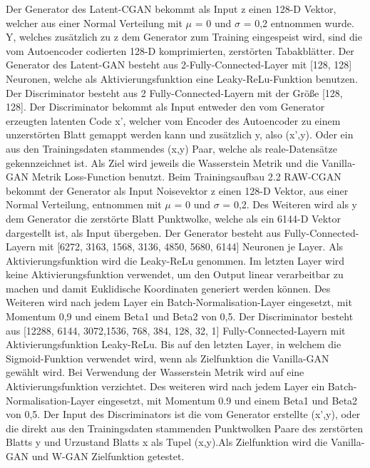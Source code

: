 \documentclass{llncs}
\begin{document}
Der Generator des Latent-CGAN bekommt als Input z einen 128-D Vektor, welcher aus einer Normal Verteilung mit $\mu$ = 0 und $\sigma$ =  0,2 entnommen wurde. Y, welches zusätzlich zu z dem Generator zum Training eingespeist wird, sind die vom Autoencoder codierten 128-D komprimierten, zerstörten Tabakblätter. Der Generator des Latent-GAN besteht aus 2-Fully-Connected-Layer mit [128, 128] Neuronen, welche als Aktivierungsfunktion eine Leaky-ReLu-Funktion benutzen. Der Discriminator besteht aus 2 Fully-Connected-Layern mit der Größe [128, 128]. Der Discriminator bekommt als Input entweder den vom Generator erzeugten latenten Code x', welcher vom Encoder des Autoencoder zu einem unzerstörten Blatt gemappt werden kann und zusätzlich y, also (x',y). Oder ein aus den Trainingsdaten stammendes (x,y) Paar, welche als reale-Datensätze gekennzeichnet ist. Als Ziel wird jeweils die Wasserstein Metrik und die Vanilla-GAN Metrik Loss-Function benutzt. Beim Trainingsaufbau 2.2 RAW-CGAN bekommt der Generator als Input Noisevektor z einen 128-D Vektor, aus einer  Normal Verteilung, entnommen mit $\mu$ =  0 und $\sigma$ =  0,2. Des Weiteren wird als y dem Generator die zerstörte Blatt Punktwolke, welche als ein 6144-D Vektor dargestellt ist, als Input übergeben. Der Generator besteht aus Fully-Connected-Layern mit [6272, 3163, 1568, 3136, 4850, 5680, 6144] Neuronen je Layer. Als Aktivierungsfunktion wird die Leaky-ReLu genommen. Im letzten Layer wird keine Aktivierungsfunktion verwendet, um den Output linear verarbeitbar zu machen und damit Euklidische Koordinaten generiert werden können. Des Weiteren wird nach jedem Layer ein Batch-Normalisation-Layer eingesetzt, mit Momentum 0,9 und einem Beta1 und Beta2 von 0,5. Der Discriminator besteht aus [12288, 6144, 3072,1536, 768, 384, 128, 32, 1] Fully-Connected-Layern mit Aktivierungsfunktion Leaky-ReLu. Bis auf den letzten Layer, in welchem die Sigmoid-Funktion verwendet wird, wenn als Zielfunktion die Vanilla-GAN gewählt wird. Bei Verwendung der Wasserstein Metrik wird auf eine Aktivierungsfunktion verzichtet. Des weiteren wird nach jedem Layer ein Batch-Normalisation-Layer eingesetzt, mit Momentum 0.9 und einem Beta1 und Beta2 von 0,5. Der Input des Discriminators ist die vom Generator erstellte (x',y), oder die direkt aus den Trainingsdaten stammenden Punktwolken Paare des zerstörten Blatts y und Urzustand Blatts x als Tupel (x,y).Als Zielfunktion wird die Vanilla-GAN und W-GAN Zielfunktion getestet.
\\\\
\end{document}
